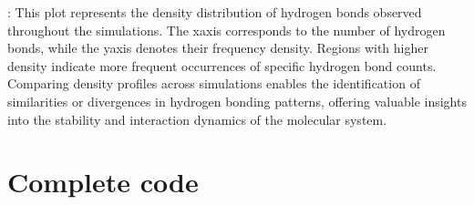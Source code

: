 \documentclass[a4paper,10pt,english]{sphinxmanual}
\let\sphinxpxdimen\pdfpxdimen\else\newdimen\sphinxpxdimen
\begin{document}
\begin{sphinxVerbatim}[commandchars=\\\{\}]
  
\end{sphinxVerbatim}

\noindent{\hspace*{\fill}\sphinxincludegraphics[width=500\sphinxpxdimen]{{Hbond_density}.png}\hspace*{\fill}}

\sphinxAtStartPar
{}: This plot represents the density distribution of hydrogen bonds observed throughout the simulations. The x\sphinxhyphen{}axis corresponds to the number of hydrogen bonds, while the y\sphinxhyphen{}axis denotes their frequency density. Regions with higher density indicate more frequent occurrences of specific hydrogen bond counts. Comparing density profiles across simulations enables the identification of similarities or divergences in hydrogen bonding patterns, offering valuable insights into the stability and interaction dynamics of the molecular system.


\section{Complete code}
\label{\detokenize{Hbond:complete-code}}
\begin{sphinxVerbatim}[commandchars=\\\{\}]
 
\end{sphinxVerbatim}

\begin{sphinxVerbatim}[commandchars=\\\{\}]
\end{sphinxVerbatim}
\end{document}
